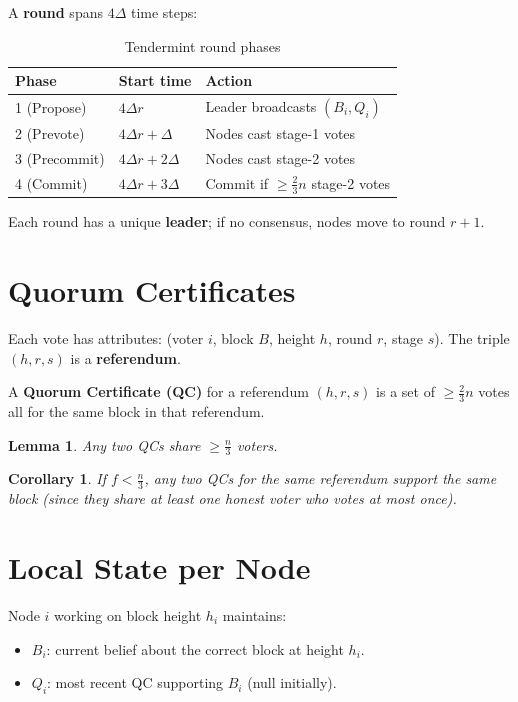 \documentclass[12pt,a4paper,openany]{book}
\theoremstyle{definition}
\theoremstyle{plain}
\newtheorem{lemma}[theorem]{Lemma}
\newtheorem{corollary}[theorem]{Corollary}
\theoremstyle{remark}
\begin{document}
A \textbf{round} spans $4\Delta$ time steps:

\begin{table}[h]
\centering
\caption{Tendermint round phases}
\begin{tabular}{lll}
\toprule
\textbf{Phase} & \textbf{Start time} & \textbf{Action} \\
\midrule
1 (Propose)  & $4\Delta r$           & Leader broadcasts $(B_i, Q_i)$ \\
2 (Prevote)  & $4\Delta r+\Delta$    & Nodes cast stage-1 votes \\
3 (Precommit)& $4\Delta r+2\Delta$   & Nodes cast stage-2 votes \\
4 (Commit)   & $4\Delta r+3\Delta$   & Commit if $\geq\!\frac{2}{3}n$ stage-2 votes \\
\bottomrule
\end{tabular}
\end{table}

Each round has a unique \textbf{leader}; if no consensus, nodes move to
round $r+1$.

\section{Quorum Certificates}

Each vote has attributes: (voter $i$, block $B$, height $h$, round $r$,
stage $s$).  The triple $(h,r,s)$ is a \textbf{referendum}.

\begin{definitionbox}
  A \textbf{Quorum Certificate (QC)} for a referendum $(h,r,s)$ is a set
  of $\geq\frac{2}{3}n$ votes all for the same block in that referendum.
\end{definitionbox}

\begin{lemma}
  Any two QCs share $\geq\frac{n}{3}$ voters.
\end{lemma}

\begin{corollary}
  If $f<\frac{n}{3}$, any two QCs for the same referendum support the
  \emph{same} block (since they share at least one honest voter who
  votes at most once).
\end{corollary}

\section{Local State per Node}

Node $i$ working on block height $h_i$ maintains:
\begin{itemize}
  \item $B_i$: current belief about the correct block at height $h_i$.
  \item $Q_i$: most recent QC supporting $B_i$ (null initially).
\end{itemize}
\end{document}

